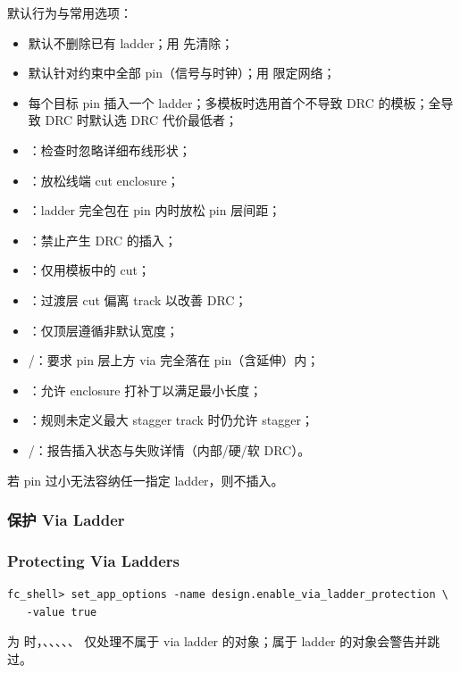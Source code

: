  默认行为与常用选项：
\begin{itemize}
  \item 默认不删除已有 ladder；用  先清除；
  \item 默认针对约束中全部 pin（信号与时钟）；用  限定网络；
  \item 每个目标 pin 插入一个 ladder；多模板时选用首个不导致 DRC 的模板；全导致 DRC 时默认选 DRC 代价最低者；
  \item {}：检查时忽略详细布线形状；
  \item {}：放松线端 cut enclosure；
  \item {}：ladder 完全包在 pin 内时放松 pin 层间距；
  \item {}：禁止产生 DRC 的插入；
  \item {}：仅用模板中的 cut；
  \item {}：过渡层 cut 偏离 track 以改善 DRC；
  \item {}：仅顶层遵循非默认宽度；
  \item {}/：要求 pin 层上方 via 完全落在 pin（含延伸）内；
  \item {}：允许 enclosure 打补丁以满足最小长度；
  \item {}：规则未定义最大 stagger track 时仍允许 stagger；
  \item {}/：报告插入状态与失败详情（内部/硬/软 DRC）。
\end{itemize}

\begin{noteBox}
若 pin 过小无法容纳任一指定 ladder，则不插入。
\end{noteBox}

\subsubsection{保护 Via Ladder}
\subsubsection*{Protecting Via Ladders}

\begin{lstlisting}
fc_shell> set_app_options -name design.enable_via_ladder_protection \
   -value true
\end{lstlisting}
为  时，、、、、、 仅处理不属于 via ladder 的对象；属于 ladder 的对象会警告并跳过。

